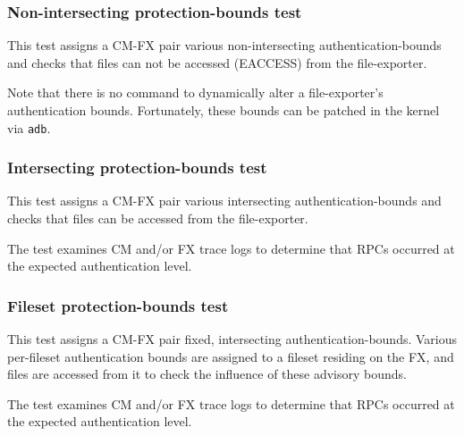 \subsubsection{Non-intersecting protection-bounds test}

This test assigns a CM-FX pair various non-intersecting authentication-bounds
and checks that files can not be accessed (EACCESS) from the file-exporter.

Note that there is no command to dynamically alter a file-exporter's
authentication bounds.  Fortunately, these bounds can be patched
in the kernel via {\tt adb}.

\subsubsection{Intersecting protection-bounds test}

This test assigns a CM-FX pair various intersecting authentication-bounds
and checks that files can be accessed from the file-exporter.

The test examines CM and/or FX trace logs to determine that RPCs
occurred at the expected authentication level.

\subsubsection{Fileset protection-bounds test}

This test assigns a CM-FX pair fixed, intersecting authentication-bounds.
Various per-fileset authentication bounds are assigned to a fileset residing
on the FX, and files are accessed from it to check the influence
of these advisory bounds.

The test examines CM and/or FX trace logs to determine that RPCs
occurred at the expected authentication level.



%
%


